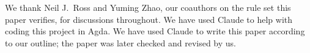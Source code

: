 \documentclass[acmsmall,review,anonymous]{acmart}
\begin{document}






\begin{acks}
We thank Neil J.\ Ross and Yuming Zhao, our coauthors on the rule set
this paper verifies, for discussions throughout.  We have used Claude to
help with coding this project in Agda.  We have used Claude to write this
paper according to our outline; the paper was later checked and revised
by us.
\end{acks}




\appendix


\end{document}
